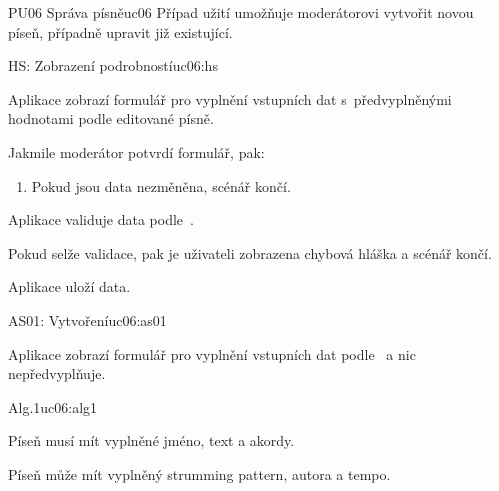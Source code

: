 \begin{usecase}{PU06 Správa písně}{uc06}
    Případ užití umožňuje moderátorovi vytvořit novou píseň, případně upravit již existující.

    \begin{scenario}{HS: Zobrazení podrobností}{uc06:hs}
        \item Aplikace zobrazí formulář pro vyplnění vstupních dat s~předvyplněnými hodnotami podle editované písně.
        \item Jakmile moderátor potvrdí formulář, pak:
        \begin{enumerate}
            \item Pokud jsou data nezměněna, scénář končí.
        \end{enumerate}
        \item Aplikace validuje data podle~.
        \item Pokud selže validace, pak je uživateli zobrazena chybová hláška a scénář končí.
        \item Aplikace uloží data.
    \end{scenario}

    \begin{scenario}{AS01: Vytvoření}{uc06:as01}
        \item Aplikace zobrazí formulář pro vyplnění vstupních dat podle~ a nic nepředvyplňuje.
    \end{scenario}

    \begin{scenario}{Alg.1}{uc06:alg1}
        \item Píseň musí mít vyplněné jméno, text a akordy.
        \item Píseň může mít vyplněný strumming pattern, autora a tempo.
    \end{scenario}
\end{usecase}
